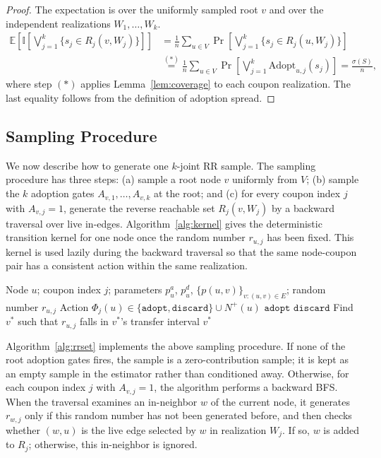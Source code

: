 \documentclass[sigconf]{acmart}
\newcommand{\E}{\mathbb{E}}
\newcommand{\I}{\mathbb{I}}
\begin{document}
\begin{proof}
The expectation is over the uniformly sampled root $v$ and over the
independent realizations $W_1,\ldots,W_k$.
\begin{align*}
  \E\!\left[
    \I\!\left[\bigvee_{j=1}^k \{s_j \in R_j(v,W_j)\}\right]
  \right]
  &= \frac{1}{n}\sum_{u\in V}
     \Pr\!\left[\bigvee_{j=1}^k \{s_j \in R_j(u,W_j)\}\right] \\
  &\stackrel{(*)}{=}
     \frac{1}{n}\sum_{u\in V}
     \Pr\!\left[\bigvee_{j=1}^k \mathrm{Adopt}_{u,j}(s_j)\right]
  = \frac{\sigma(S)}{n},
\end{align*}
where step $(*)$ applies Lemma~\ref{lem:coverage} to each coupon realization.
The last equality follows from the definition of adoption spread.
\end{proof}

\subsection{Sampling Procedure}

We now describe how to generate one $k$-joint RR sample.
The sampling procedure has three steps: (a) sample a root node $v$
uniformly from $V$; (b) sample the $k$ adoption gates
$A_{v,1},\ldots,A_{v,k}$ at the root; and (c) for every coupon index $j$ with
$A_{v,j}=1$, generate the reverse reachable set $R_j(v,W_j)$ by a
backward traversal over live in-edges.
Algorithm~\ref{alg:kernel} gives the deterministic transition kernel
for one node once the random number $r_{u,j}$ has been fixed.
This kernel is used lazily during the backward traversal so that the
same node-coupon pair has a consistent action within the same
realization.

\begin{algorithm}[t]
\caption{Single-Node Transition Kernel}
\label{alg:kernel}
\begin{algorithmic}[1]
\Require Node $u$; coupon index $j$; parameters $p_u^a$, $p_u^d$,
  $\{p(u,v)\}_{v:(u,v)\in E}$; random number $r_{u,j}$
\Ensure Action
  $\Phi_j(u)\in\{\mathtt{adopt},\mathtt{discard}\}\cup N^+(u)$
  \State \Return $\mathtt{adopt}$
  \State \Return $\mathtt{discard}$
\Else
  \State Find $v^*$ such that $r_{u,j}$ falls in $v^*$'s transfer interval
  \State \Return $v^*$
\EndIf
\end{algorithmic}
\end{algorithm}

Algorithm~\ref{alg:rrset} implements the above sampling procedure.
If none of the root adoption gates fires, the sample is a
zero-contribution sample; it is kept as an empty sample in the estimator
rather than conditioned away.
Otherwise, for each coupon index $j$ with $A_{v,j}=1$, the algorithm performs
a backward BFS.
When the traversal examines an in-neighbor $w$ of the current node, it
generates $r_{w,j}$ only if this random number has not been generated
before, and then checks whether $(w,u)$ is the live edge selected by
$w$ in realization $W_j$.
If so, $w$ is added to $R_j$; otherwise, this in-neighbor is ignored.
\end{document}
